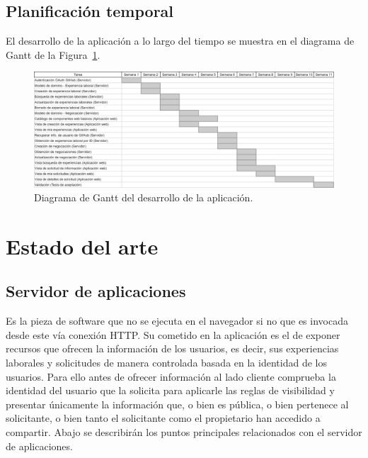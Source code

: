 \documentclass[a4paper, 12pt]{book}
\begin{document}
    \section{Planificación temporal}
    \label{sec:planificacion-temporal}

    El desarrollo de la aplicación a lo largo del tiempo se muestra en el diagrama de Gantt de la Figura~\ref{figure:gantt}.

    \begin{figure}
        \centering
        \includegraphics[width=15cm, keepaspectratio]{img/Gantt.png}
        \caption{Diagrama de Gantt del desarrollo de la aplicación.}\label{figure:gantt}
    \end{figure}



    \cleardoublepage


    \chapter{Estado del arte}
    \label{chap:estado}


    \section{Servidor de aplicaciones}
    \label{sec:intro_applicationserver}

    Es la pieza de software que no se ejecuta en el navegador si no que es invocada desde este vía conexión HTTP.
    Su cometido en la aplicación es el de exponer recursos que ofrecen la información de los usuarios, es decir, sus experiencias laborales y solicitudes de manera controlada basada en la identidad de los usuarios.
    Para ello antes de ofrecer información al lado cliente comprueba la identidad del usuario que la solicita para aplicarle las reglas de visibilidad y presentar únicamente la información que,
    o bien es pública, o bien pertenece al solicitante, o bien tanto el solicitante como el propietario han accedido a compartir. Abajo se describirán los puntos principales relacionados con el servidor de aplicaciones.
\end{document}
